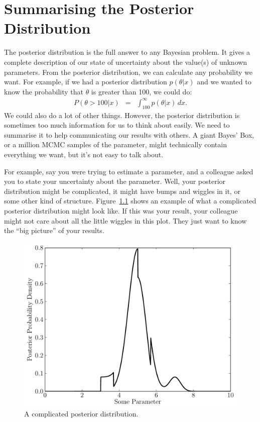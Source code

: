 \chapter{Summarising the Posterior Distribution}
The posterior distribution is the full answer to any Bayesian problem. It gives
a complete description of our state of uncertainty about the value(s) of unknown
parameters. From the posterior distribution, we can calculate any probability
we want. For example, if we had a posterior distribution $p(\theta|x)$ and we
wanted to know the probability that $\theta$ is greater than 100, we could do:
\begin{eqnarray}
P(\theta > 100 | x) &=& \int_{100}^\infty p(\theta | x) \, dx.
\end{eqnarray}
We could also do a lot of other things.
However, the posterior distribution is sometimes too much
information for us to think about easily. We need to summarise it to help
communicating our results with others. A giant Bayes' Box, or a million MCMC
samples of the parameter, might technically
contain everything we want, but it's not easy to talk about.

For example, say you were trying to estimate
a parameter, and a colleague asked you to state your uncertainty about the
parameter. Well, your posterior distribution might be complicated, it might
have bumps and wiggles in it, or some other kind of structure.
Figure~\ref{fig:complicated_posterior} shows an example of what a complicated
posterior distribution might look like. If this was your result, your colleague
might not care about all the little wiggles in this plot. They just want to know
the ``big picture'' of your results.
\begin{figure}[h!]
\begin{center}
\includegraphics[scale=0.6]{Figures/complicated_posterior.pdf}
\caption{A complicated posterior distribution.\label{fig:complicated_posterior}}
\end{center}
\end{figure}

